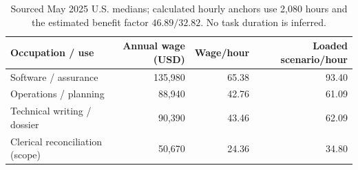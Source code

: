 \begin{table}[H]\small\centering\begin{tabular}{lrrr}\toprule Occupation / use & Annual wage (USD) & Wage/hour & Loaded scenario/hour\\\midrule
Software / assurance & 135,980 & 65.38 & 93.40 \\
Operations / planning & 88,940 & 42.76 & 61.09 \\
Technical writing / dossier & 90,390 & 43.46 & 62.09 \\
Clerical reconciliation (scope) & 50,670 & 24.36 & 34.80 \\
\bottomrule\end{tabular}\caption{Sourced May 2025 U.S. medians; calculated hourly anchors use 2,080 hours and the estimated benefit factor $46.89/32.82$. No task duration is inferred.}\end{table}
